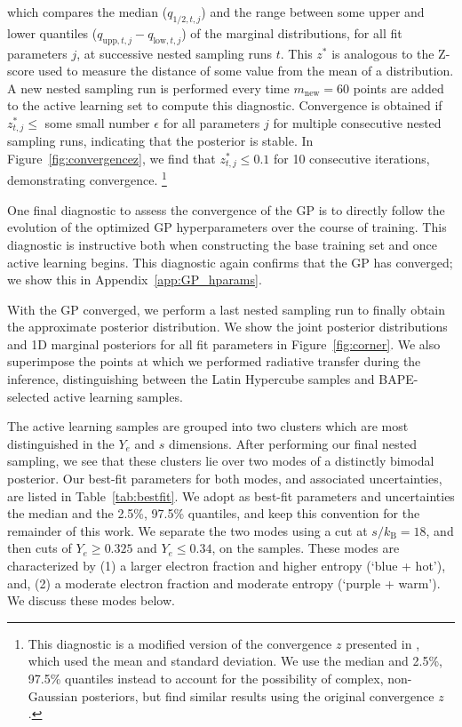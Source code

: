 \documentclass[twocolumn, twocolappendix]{aastex63}
\begin{document}
\noindent which compares the median ($q_{1/2,t,j}$) and the range between some upper and lower quantiles ($q_{\mathrm{upp},t,j} - q_{\mathrm{low},t,j}$) of the marginal distributions, for all fit parameters $j$, at successive nested sampling runs $t$. This $z^{*}$ is analogous to the Z-score used to measure the distance of some value from the mean of a distribution. A new nested sampling run is performed every time $m_{\mathrm{new}} = 60$ points are added to the active learning set to compute this diagnostic. Convergence is obtained if $z^{*}_{t,j} \leqslant $ some small number $\epsilon$ for all parameters $j$ for multiple consecutive nested sampling runs, indicating that the posterior is stable. In Figure~\ref{fig:convergencez}, we find that $z^{*}_{t,j} \leqslant 0.1$ for 10 consecutive iterations, demonstrating convergence. \footnote{This diagnostic is a modified version of the convergence $z$ presented in \citealt{fleming20}, which used the mean and standard deviation. We use the median and 2.5\%, 97.5\% quantiles instead to account for the possibility of complex, non-Gaussian posteriors, but find similar results using the original convergence $z$.}


One final diagnostic to assess the convergence of the GP is to directly follow the evolution of the optimized GP hyperparameters over the course of training. This diagnostic is instructive both when constructing the base training set and once active learning begins. This diagnostic again confirms that the GP has converged; we show this in Appendix~\ref{app:GP_hparams}.


With the GP converged, we perform a last nested sampling run to finally obtain the approximate posterior distribution.  We show the joint posterior distributions and 1D marginal posteriors for all fit parameters in Figure~\ref{fig:corner}. We also superimpose the points at which we performed radiative transfer during the inference, distinguishing between the Latin Hypercube samples and BAPE-selected active learning samples. 

The active learning samples are grouped into two clusters which are most distinguished in the $Y_e$ and $s$ dimensions. After performing our final nested sampling, we see that these clusters lie over two modes of a distinctly bimodal posterior. Our best-fit parameters for both modes, and associated uncertainties, are listed in Table~\ref{tab:bestfit}. We adopt as best-fit parameters and uncertainties the median and the 2.5\%, 97.5\% quantiles, and keep this convention for the remainder of this work. We separate the two modes using a cut at $s/k_{\mathrm{B}} = 18$, and then cuts of $Y_e \geqslant 0.325$ and $Y_e \leqslant 0.34$, on the samples. These modes are characterized by (1) a larger electron fraction and higher entropy (`blue + hot'), and, (2) a moderate electron fraction and moderate entropy (`purple + warm'). We discuss these modes below. 
\end{document}
